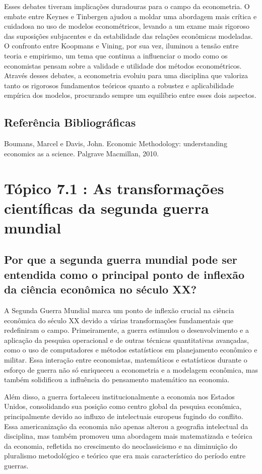 \documentclass[a4paper,12pt]{article}[abntex2]
\begin{document}
Esses debates tiveram implicações duradouras para o campo da econometria. O embate entre Keynes e Tinbergen ajudou a moldar uma abordagem mais crítica e cuidadosa no uso de modelos econométricos, levando a um exame mais rigoroso das suposições subjacentes e da estabilidade das relações econômicas modeladas. O confronto entre Koopmans e Vining, por sua vez, iluminou a tensão entre teoria e empirismo, um tema que continua a influenciar o modo como os economistas pensam sobre a validade e utilidade dos métodos econométricos. Através desses debates, a econometria evoluiu para uma disciplina que valoriza tanto os rigorosos fundamentos teóricos quanto a robustez e aplicabilidade empírica dos modelos, procurando sempre um equilíbrio entre esses dois aspectos.

\subsection{\textbf{Referência Bibliográficas}}
Boumans, Marcel e Davis, John. Economic Methodology: understanding economics as a
science. Palgrave Macmillan, 2010.


\section{\textbf{Tópico 7.1 : As transformações científicas da segunda guerra mundial}}

\subsection{\textbf{Por que a segunda guerra mundial pode ser entendida como o principal ponto de inflexão da ciência econômica no século XX?}}
A Segunda Guerra Mundial marca um ponto de inflexão crucial na ciência econômica do século XX devido a várias transformações fundamentais que redefiniram o campo. Primeiramente, a guerra estimulou o desenvolvimento e a aplicação da pesquisa operacional e de outras técnicas quantitativas avançadas, como o uso de computadores e métodos estatísticos em planejamento econômico e militar. Essa interação entre economistas, matemáticos e estatísticos durante o esforço de guerra não só enriqueceu a econometria e a modelagem econômica, mas também solidificou a influência do pensamento matemático na economia.

Além disso, a guerra fortaleceu institucionalmente a economia nos Estados Unidos, consolidando sua posição como centro global da pesquisa econômica, principalmente devido ao influxo de intelectuais europeus fugindo do conflito. Essa americanização da economia não apenas alterou a geografia intelectual da disciplina, mas também promoveu uma abordagem mais matematizada e teórica da economia, refletida no crescimento do neoclassicismo e na diminuição do pluralismo metodológico e teórico que era mais característico do período entre guerras.
\end{document}

